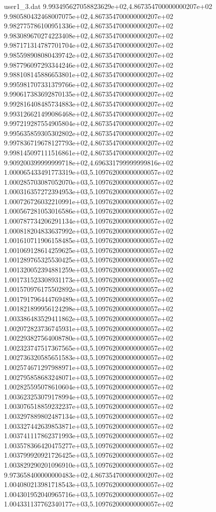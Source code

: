 \begin{filecontents}{user1_3.dat}
9.993495627058823629e+02,4.867354700000000207e+02
9.980580432468007075e+02,4.867354700000000207e+02
9.982775786100951336e+02,4.867354700000000207e+02
9.983089670274223408e+02,4.867354700000000207e+02
9.987171314787701704e+02,4.867354700000000207e+02
9.985598908080439742e+02,4.867354700000000207e+02
9.987796097293344246e+02,4.867354700000000207e+02
9.988108145886653801e+02,4.867354700000000207e+02
9.995981707331379766e+02,4.867354700000000207e+02
9.990617383692870135e+02,4.867354700000000207e+02
9.992816408485734883e+02,4.867354700000000207e+02
9.993126621499086468e+02,4.867354700000000207e+02
9.997219287554905804e+02,4.867354700000000207e+02
9.995635859305302802e+02,4.867354700000000207e+02
9.997836719678127793e+02,4.867354700000000207e+02
9.998145097111516861e+02,4.867354700000000207e+02
9.909200399999999718e+02,4.696331799999999816e+02
1.000065433491773319e+03,5.109762000000000057e+02
1.000285703087052070e+03,5.109762000000000057e+02
1.000316357272394953e+03,5.109762000000000057e+02
1.000726726032210991e+03,5.109762000000000057e+02
1.000567281053016586e+03,5.109762000000000057e+02
1.000787734206291134e+03,5.109762000000000057e+02
1.000818204833637992e+03,5.109762000000000057e+02
1.001610711906158485e+03,5.109762000000000057e+02
1.001069128614259625e+03,5.109762000000000057e+02
1.001289765325530425e+03,5.109762000000000057e+02
1.001320052394881259e+03,5.109762000000000057e+02
1.001731523308931173e+03,5.109762000000000057e+02
1.001570976175502892e+03,5.109762000000000057e+02
1.001791796444769489e+03,5.109762000000000057e+02
1.001821899956124298e+03,5.109762000000000057e+02
1.003386483529411862e+03,5.109762000000000057e+02
1.002072823736745931e+03,5.109762000000000057e+02
1.002293827564008780e+03,5.109762000000000057e+02
1.002323747517367565e+03,5.109762000000000057e+02
1.002736320585651583e+03,5.109762000000000057e+02
1.002574671297988971e+03,5.109762000000000057e+02
1.002795858683248071e+03,5.109762000000000057e+02
1.002825595078610604e+03,5.109762000000000057e+02
1.003623253079178994e+03,5.109762000000000057e+02
1.003076518859232237e+03,5.109762000000000057e+02
1.003297889802487134e+03,5.109762000000000057e+02
1.003327442639853871e+03,5.109762000000000057e+02
1.003741117862371993e+03,5.109762000000000057e+02
1.003578366420475277e+03,5.109762000000000057e+02
1.003799920921726425e+03,5.109762000000000057e+02
1.003829290201096910e+03,5.109762000000000057e+02
9.973658400000000483e+02,4.867354700000000207e+02
1.004080213981718543e+03,5.109762000000000057e+02
1.004301952040965716e+03,5.109762000000000057e+02
1.004331137762340177e+03,5.109762000000000057e+02

\end{filecontents}
